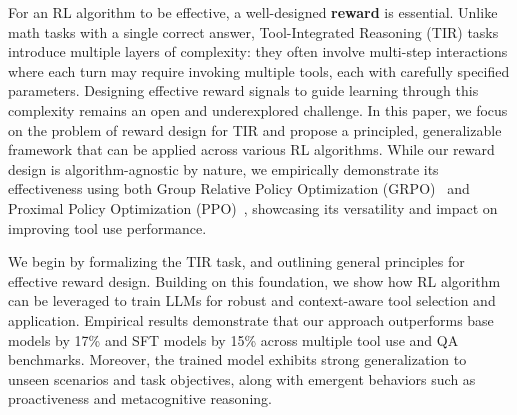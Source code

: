 For an RL algorithm to be effective, a well-designed \textbf{reward} is essential. Unlike math tasks with a single correct answer, Tool-Integrated Reasoning (TIR) tasks introduce multiple layers of complexity: they often involve multi-step interactions where each turn may require invoking multiple tools, each with carefully specified parameters. Designing effective reward signals to guide learning through this complexity remains an open and underexplored challenge. In this paper, we focus on the problem of reward design for TIR and propose a principled, generalizable framework that can be applied across various RL algorithms. While our reward design is algorithm-agnostic by nature, we empirically demonstrate its effectiveness using both Group Relative Policy Optimization (GRPO)~\citep{shao2024deepseekmath} and Proximal Policy Optimization (PPO)~\citep{schulman2017proximal}, showcasing its versatility and impact on improving tool use performance.

We begin by formalizing the TIR task, and outlining general principles for effective reward design. Building on this foundation, we show how RL algorithm can be leveraged to train LLMs for robust and context-aware tool selection and application. Empirical results demonstrate that our approach outperforms base models by 17\% and SFT models by 15\% across multiple tool use and QA benchmarks. Moreover, the trained model exhibits strong generalization to unseen scenarios and task objectives, along with emergent behaviors such as proactiveness and metacognitive reasoning.

